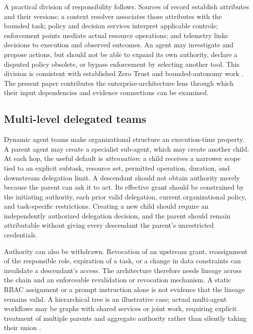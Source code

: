 \documentclass[11pt,letterpaper]{article}
\newcommand{\parencite}[1]{\citep{#1}}
\begin{document}
A practical division of responsibility follows. Sources of record establish attributes and their versions; a context resolver associates those attributes with the bounded task; policy and decision services interpret applicable controls; enforcement points mediate actual resource operations; and telemetry links decisions to execution and observed outcomes. An agent may investigate and propose actions, but should not be able to expand its own authority, declare a disputed policy obsolete, or bypass enforcement by selecting another tool. This division is consistent with established Zero Trust and bounded-autonomy work \parencite{nist207a2023,opa2026agent,jorgensen2026governing}. The present paper contributes the enterprise-architecture lens through which their input dependencies and evidence connections can be examined.

\subsection{Multi-level delegated teams}
Dynamic agent teams make organizational structure an execution-time property. A parent agent may create a specialist sub-agent, which may create another child. At each hop, the useful default is \emph{attenuation}: a child receives a narrower scope tied to an explicit subtask, resource set, permitted operation, duration, and downstream delegation limit. A descendant should not obtain authority merely because the parent can ask it to act. Its effective grant should be constrained by the initiating authority, each prior valid delegation, current organizational policy, and task-specific restrictions. Creating a new child should require an independently authorized delegation decision, and the parent should remain attributable without giving every descendant the parent's unrestricted credentials.

Authority can also be withdrawn. Revocation of an upstream grant, reassignment of the responsible role, expiration of a task, or a change in data constraints can invalidate a descendant's access. The architecture therefore needs lineage across the chain and an enforceable revalidation or revocation mechanism. A static RBAC assignment or a prompt instruction alone is not evidence that the lineage remains valid. A hierarchical tree is an illustrative case; actual multi-agent workflows may be graphs with shared services or joint work, requiring explicit treatment of multiple parents and aggregate authority rather than silently taking their union \parencite{tallam2026authorization}.
\end{document}
